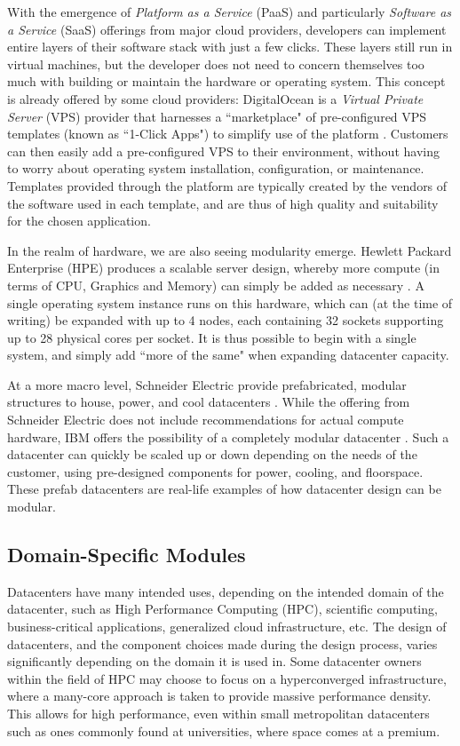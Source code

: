 \documentclass[11pt]{article}
\begin{document}
		With the emergence of \textit{Platform as a Service} (PaaS) and particularly \textit{Software as a Service} (SaaS) offerings from major cloud providers, developers can implement entire layers of their software stack with just a few clicks. 
		These layers still run in virtual machines, but the developer does not need to concern themselves too much with building or maintain the hardware or operating system.
		This concept is already offered by some cloud providers: DigitalOcean is a \textit{Virtual Private Server} (VPS) provider that harnesses a ``marketplace" of pre-configured VPS templates (known as ``1-Click Apps") to simplify use of the platform \cite{DigitalOcean2020}. 
		Customers can then easily add a pre-configured VPS to their environment, without having to worry about operating system installation, configuration, or maintenance. 
		Templates provided through the platform are typically created by the vendors of the software used in each template, and are thus of high quality and suitability for the chosen application.

		In the realm of hardware, we are also seeing modularity emerge. 
		Hewlett Packard Enterprise (HPE) produces a scalable server design, whereby more compute (in terms of CPU, Graphics and Memory) can simply be added as necessary \cite{Bang2020}.
		A single operating system instance runs on this hardware, which can (at the time of writing) be expanded with up to 4 nodes, each containing 32 sockets supporting up to 28 physical cores per socket.
		It is thus possible to begin with a single system, and simply add ``more of the same" when expanding datacenter capacity.

		At a more macro level, Schneider Electric provide prefabricated, modular structures to house, power, and cool datacenters \cite{Torell2014, Torell2017}.
		While the offering from Schneider Electric does not include recommendations for actual compute hardware, IBM offers the possibility of a completely modular datacenter \cite{IBM2014}.
		Such a datacenter can quickly be scaled up or down depending on the needs of the customer, using pre-designed components for power, cooling, and floorspace. 
		These prefab datacenters are real-life examples of how datacenter design can be modular.
	
	\subsection{Domain-Specific Modules}
		Datacenters have many intended uses, depending on the intended domain of the datacenter, such as High Performance Computing (HPC), scientific computing, business-critical applications, generalized cloud infrastructure, etc.
		The design of datacenters, and the component choices made during the design process, varies significantly depending on the domain it is used in.
		Some datacenter owners within the field of HPC may choose to focus on a hyperconverged infrastructure, where a many-core approach is taken to provide massive performance density.
		This allows for high performance, even within small metropolitan datacenters such as ones commonly found at universities, where space comes at a premium.
\end{document}
